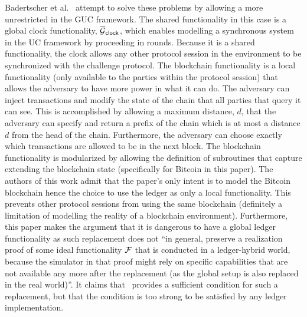 Badertscher et al.~\cite{badertscher2017bitcoin} attempt to solve these problems by allowing a more unrestricted in the GUC framework.
The shared functionality in this case is a global clock functionality, ${\overline{\mathcal{G}}}_{{\mathsf {clock}}}$, which enables modelling a synchronous system in the UC framework by proceeding in rounds.
Because it is a shared functionality, the clock allows any other protocol session in the environment to be synchronized with the challenge protocol. 
The blockchain functionality is a local functionality (only available to the parties within the protocol session) that allows the adversary to have more power in what it can do.
The adversary can inject transactions and modify the state of the chain that all parties that query it can see.
This is accomplished by allowing a maximum distance, $d$, that the adversary can specify and return a prefix of the chain which is at most a distance $d$ from the head of the chain.
Furthermore, the adversary can choose exactly which transactions are allowed to be in the next block.
The blockchain functionality is modularized by allowing the definition of subroutines that capture extending the blockchain state (specifically for Bitcoin in this paper).
The authors of this work admit that the paper's only intent is to model the Bitcoin blockchain hence the choice to use the ledger as only a local functionality. 
This prevents other protocol sessions from using the same blockchain (definitely a limitation of modelling the reality of a blockchain environment).
Furthermore, this paper makes the argument that it is dangerous to have a global ledger functionality as such replacement does not ``in general, preserve a realization proof of some ideal functionality $\mathcal{F}{}$ that is conducted in a ledger-hybrid world, because the simulator in that proof might rely on specific capabilities that are not available any more after the replacement (as the global setup is also replaced in the real world)''.
It claims that~\cite{canetti2016universally} provides a sufficient condition for such a replacement, but that the condition is too strong to be satisfied by any ledger implementation.

